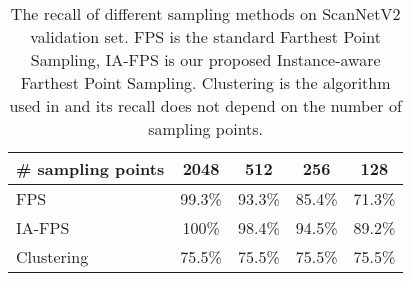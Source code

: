 \documentclass[10pt,twocolumn,letterpaper]{article}
\begin{document}
\begin{table}[t]
\small
\setlength{\tabcolsep}{7pt}
\centering
\begin{tabular}{lcccc}
\toprule
\textbf{\# sampling points}         & 2048  & 512  & 256 & 128  \\ 
\midrule
FPS      & 99.3\% &  93.3\% & 85.4\% & 71.3\% \\ 
IA-FPS  & 100\% & 98.4\% &  94.5\% &  89.2\% \\
\midrule
Clustering & 75.5\% & 75.5\% & 75.5\%& 75.5\% \\
\bottomrule
\end{tabular}
\vspace{-4pt}
\caption{The recall of different sampling methods on ScanNetV2 validation set. FPS is the standard Farthest Point Sampling, IA-FPS is our proposed Instance-aware Farthest Point Sampling. Clustering is the algorithm used in \cite{he2021dyco3d,chen2021hierarchical,vu2022softgroup} and its recall does not depend on the number of sampling points.}
\label{tab:recall_rate}
\vspace{-16pt}
\end{table}







\end{document}
